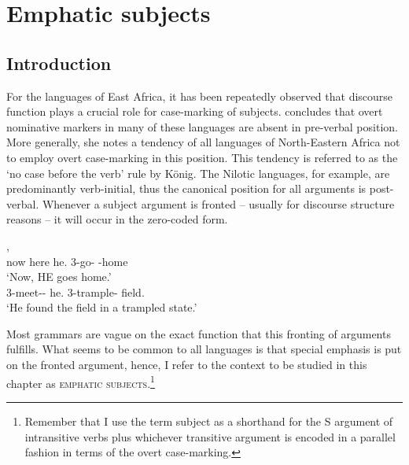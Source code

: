 \chapter{Emphatic subjects}\label{emphaticS}


\section{Introduction}\label{EmphIntro}


For the languages of East Africa, it has been repeatedly observed that discourse function plays a crucial role for case-marking of subjects. 
\citet[240--271]{Koenig:2008} concludes that overt nominative markers in many of these languages are absent in pre-verbal position. 
More generally, she notes a tendency of all languages of North-Eastern Africa not to employ overt case-marking in this position. 
This tendency is referred to as the `no case before the verb' rule by K\"onig. 
The Nilotic languages, for example, are predominantly verb-initial, thus the canonical position for all arguments is post-verbal. 
Whenever a subject argument is fronted -- usually for discourse structure reasons -- it will occur in the zero-coded form.

\begin{exe}\ex\label{TurEmphEx}
\begin{xlist}
\ex\gll{}  ,   \\
now here \topic{} he.\acc{} 3-go-\asp{} \dir{}-home\\
\glt `Now, HE goes home.'
\ex\gll{}    \\
3-meet-\epen{}-\ventiv{} he.\nom{}  3-trample-\result{} field.\acc{}\\
\glt `He found the field in a trampled state.'
\end{xlist}
\end{exe}

Most grammars are vague on the exact function that this fronting of arguments fulfills. 
What seems to be common to all languages is that special emphasis is put on the fronted argument, hence, I refer to the context to be studied in this chapter as \textsc{emphatic subjects}.\footnote{Remember that I use the term subject as a shorthand for the S argument of intransitive verbs plus whichever transitive argument is encoded in a parallel fashion in terms of the overt case-marking.}  

